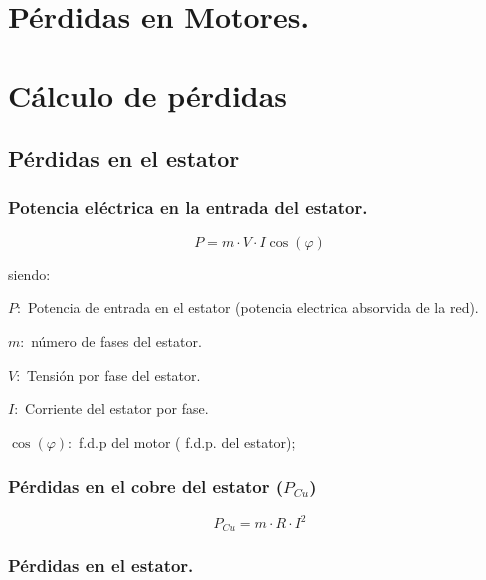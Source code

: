 \documentclass[../main]{subfiles}
\begin{document}
\section{Pérdidas en Motores.}
\begin{center}
\end{center}

\section{Cálculo de pérdidas}
\subsection{Pérdidas en el estator}

\subsubsection{Potencia eléctrica en la entrada del estator.}

\begin{equation}
    P= m \cdot V \cdot I \cos(\varphi)
\end{equation}

siendo:

$P:$ Potencia de entrada en el estator (potencia electrica absorvida de la red).

$m:$ número de fases del estator.

$V:$ Tensión por fase del estator.

$I:$ Corriente del estator por fase.

$\cos(\varphi):$ f.d.p del motor ( f.d.p. del estator);

\subsubsection{Pérdidas en el cobre del estator ($P_{Cu}$)}

\begin{equation}
    P_{Cu}= m \cdot R \cdot I^2
\end{equation}

\subsubsection{Pérdidas en el estator.}
\end{document}
